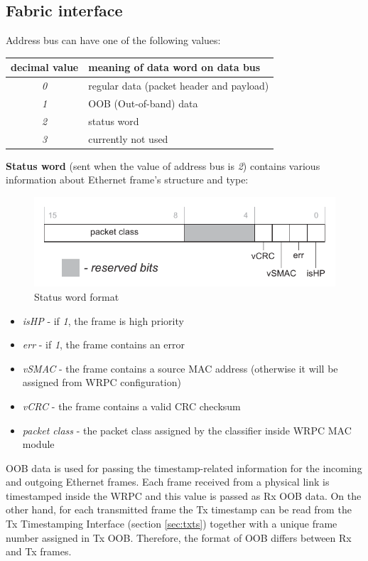 \subsection{Fabric interface}

Address bus can have one of the following values:
\begin{center}
\begin{tabular}{|c|l|}
  \hline {\bf decimal value} & {\bf meaning of data word on data bus}\\
  \hline
  \emph{0} & regular data (packet header and payload)\\
  \emph{1} & OOB (Out-of-band) data\\
  \emph{2} & status word\\
  \emph{3} & currently not used\\
  \hline
\end{tabular}
\end{center}

{\bf Status word} (sent when the value of address bus is \emph{2}) contains
various information about Ethernet frame's structure and type:
\begin{figure}[ht]
  \begin{center}
    \includegraphics[width=.6\textwidth]{fig/status.pdf}
    \caption{Status word format}
  \end{center}
\end{figure}

\begin{itemize}
  \item[] \emph{isHP} - if \emph{1}, the frame is high priority
  \item[] \emph{err} - if \emph{1}, the frame contains an error
  \item[] \emph{vSMAC} - the frame contains a source MAC address (otherwise
    it will be assigned from WRPC configuration)
  \item[] \emph{vCRC} - the frame contains a valid CRC checksum
  \item[] \emph{packet class} - the packet class assigned by the classifier
    inside WRPC MAC module
\end{itemize}

OOB data is used for passing the timestamp-related information for the incoming and 
outgoing Ethernet frames. Each frame received from a physical link is
timestamped inside the WRPC and this value is passed as Rx OOB
data. On the other hand, for each transmitted frame the Tx timestamp can be read
from the Tx Timestamping Interface (section \ref{sec:txts}) together with a unique
frame number assigned in Tx OOB. Therefore, the format of OOB differs between Rx
and Tx frames.\\

